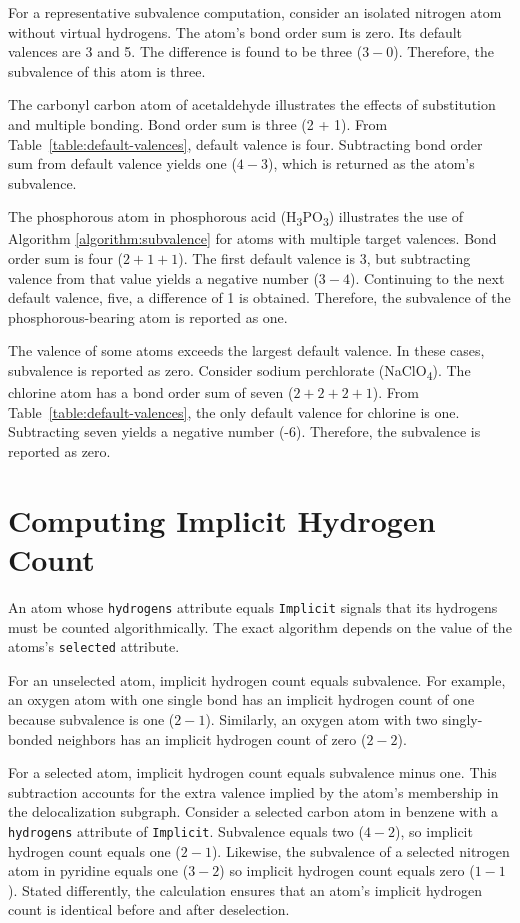 \documentclass{article}
\def\ttt{\texttt}
\begin{document}
For a representative subvalence computation, consider an isolated nitrogen atom without virtual hydrogens. The atom's bond order sum is zero. Its default valences are 3 and 5. The difference is found to be three ($3 - 0$). Therefore, the subvalence of this atom is three.

The carbonyl carbon atom of acetaldehyde illustrates the effects of substitution and multiple bonding. Bond order sum is three (2 + 1). From Table~\ref{table:default-valences}, default valence is four. Subtracting bond order sum from default valence yields one ($4 - 3$), which is returned as the atom's subvalence.

The phosphorous atom in phosphorous acid (H\textsubscript{3}PO\textsubscript{3}) illustrates the use of Algorithm \ref{algorithm:subvalence} for atoms with multiple target valences. Bond order sum is four ($2 + 1 + 1$). The first default valence is 3, but subtracting valence from that value yields a negative number ($3 - 4$). Continuing to the next default valence, five, a difference of 1 is obtained. Therefore, the subvalence of the phosphorous-bearing atom is reported as one.

The valence of some atoms exceeds the largest default valence. In these cases, subvalence is reported as zero. Consider sodium perchlorate (NaClO\textsubscript{4}). The chlorine atom has a bond order sum of seven ($2 + 2 + 2 + 1$). From Table~\ref{table:default-valences}, the only default valence for chlorine is one. Subtracting seven yields a negative number (-6). Therefore, the subvalence is reported as zero.

\section*{Computing Implicit Hydrogen Count}

An atom whose \ttt{hydrogens} attribute equals \ttt{Implicit} signals that its hydrogens must be counted algorithmically. The exact algorithm depends on the value of the atoms's \ttt{selected} attribute.

For an unselected atom, implicit hydrogen count equals subvalence. For example, an oxygen atom with one single bond has an implicit hydrogen count of one because subvalence is one ($2 - 1$). Similarly, an oxygen atom with two singly-bonded neighbors has an implicit hydrogen count of zero ($2 - 2$).

For a selected atom, implicit hydrogen count equals subvalence minus one. This subtraction accounts for the extra valence implied by the atom's membership in the delocalization subgraph. Consider a selected carbon atom in benzene with a \ttt{hydrogens} attribute of \ttt{Implicit}. Subvalence equals two ($4 - 2$), so implicit hydrogen count equals one ($2 - 1$). Likewise, the subvalence of a selected nitrogen atom in pyridine equals one ($3 - 2$) so implicit hydrogen count equals zero ($1 - 1$). Stated differently, the calculation ensures that an atom's implicit hydrogen count is identical before and after deselection.
\end{document}
